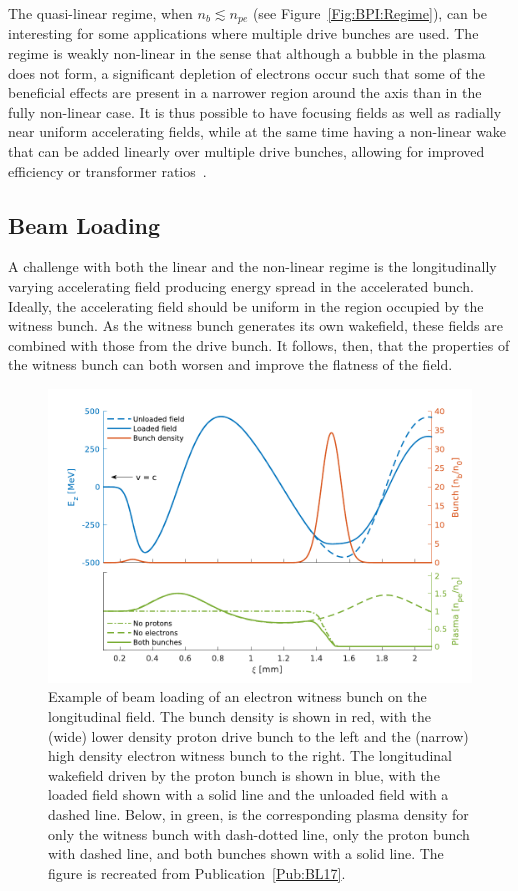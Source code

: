 The quasi-linear regime, when $n_{b} \lesssim n_{pe}$ (see Figure~\ref{Fig:BPI:Regime}), can be interesting for some applications where multiple drive bunches are used.
The regime is weakly non-linear in the sense that although a bubble in the plasma does not form, a significant depletion of electrons occur such that some of the beneficial effects are present in a narrower region around the axis than in the fully non-linear case.
It is thus possible to have focusing fields as well as radially near uniform accelerating fields, while at the same time having a non-linear wake that can be added linearly over multiple drive bunches, allowing for improved efficiency or transformer ratios~\cite{muggli:2017,rosenzweig:2010}.

\subsection{Beam Loading}
\label{Int:BPI:BLoad}

A challenge with both the linear and the non-linear regime is the longitudinally varying accelerating field producing energy spread in the accelerated bunch.
Ideally, the accelerating field should be uniform in the region occupied by the witness bunch.
As the witness bunch generates its own wakefield, these fields are combined with those from the drive bunch.
It follows, then, that the properties of the witness bunch can both worsen and improve the flatness of the field.

\begin{figure}[hbt]
    \centering
    \includegraphics[width=0.8125\linewidth,trim={0mm 0mm 0mm 0mm},clip]{figures/BeamLoading}
    \caption{\label{Fig:BPI:BLoad}
        Example of beam loading of an electron witness bunch on the longitudinal field.
        The bunch density is shown in red, with the (wide) lower density proton drive bunch to the left and the (narrow) high density electron witness bunch to the right.
        The longitudinal wakefield driven by the proton bunch is shown in blue, with the loaded field shown with a solid line and the unloaded field with a dashed line.
        Below, in green, is the corresponding plasma density for only the witness bunch with dash-dotted line, only the proton bunch with dashed line, and both bunches shown with a solid line.
        The figure is recreated from Publication~\ref{Pub:BL17}.
    }
\end{figure}

